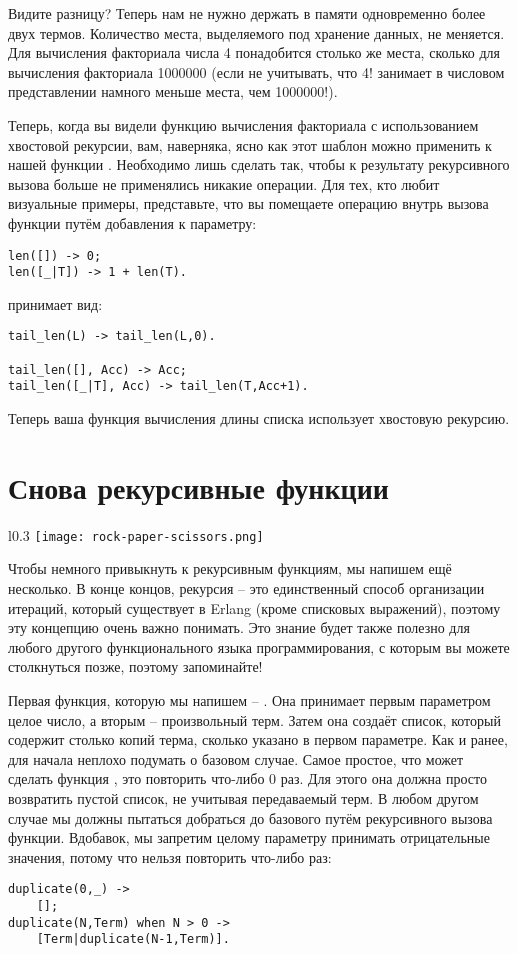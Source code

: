Видите разницу?
Теперь нам не нужно держать в памяти одновременно более двух термов.
Количество места, выделяемого под хранение данных, не меняется.
Для вычисления факториала числа 4 понадобится столько же места, сколько для вычисления факториала 1000000 (если не учитывать, что 4! занимает в числовом представлении намного меньше места, чем 1000000!).

Теперь, когда вы видели функцию вычисления факториала с использованием хвостовой рекурсии, вам, наверняка, ясно как этот шаблон можно применить к нашей функции .
Необходимо лишь сделать так, чтобы к результату рекурсивного вызова больше не применялись никакие операции.
Для тех, кто любит визуальные примеры, представьте, что вы помещаете операцию  внутрь вызова функции путём добавления к параметру:
\begin{lstlisting}[style=erlang]
len([]) -> 0;
len([_|T]) -> 1 + len(T).
\end{lstlisting}
принимает вид:
\begin{lstlisting}[style=erlang]
tail_len(L) -> tail_len(L,0).
 
tail_len([], Acc) -> Acc;
tail_len([_|T], Acc) -> tail_len(T,Acc+1).
\end{lstlisting}

Теперь ваша функция вычисления длины списка использует хвостовую рекурсию.
\section{Снова рекурсивные функции}
\begin{wrapfigure}{l}{0.3\linewidth}
    \texttt{[image: rock-paper-scissors.png]}
\end{wrapfigure}
Чтобы немного привыкнуть к рекурсивным функциям, мы напишем ещё несколько.
В конце концов, рекурсия \--- это единственный способ организации итераций, который существует в Erlang (кроме списковых выражений), поэтому эту концепцию очень важно понимать.
Это знание будет также полезно для любого другого функционального языка программирования, с которым вы можете столкнуться позже, поэтому запоминайте!

Первая функция, которую мы напишем \--- .
Она принимает первым параметром целое число, а вторым \--- произвольный терм.
Затем она создаёт список, который содержит столько копий терма, сколько указано в первом параметре.
Как и ранее, для начала неплохо подумать о базовом случае.
Самое простое, что может сделать функция , это повторить что\--либо 0 раз.
Для этого она должна просто возвратить пустой список, не учитывая передаваемый терм.
В любом другом случае мы должны пытаться добраться до базового путём рекурсивного вызова функции.
Вдобавок, мы запретим целому параметру принимать отрицательные значения, потому что нельзя повторить что\--либо  раз:
\begin{lstlisting}[style=erlang]
duplicate(0,_) ->
    [];
duplicate(N,Term) when N > 0 ->
    [Term|duplicate(N-1,Term)].
\end{lstlisting}

